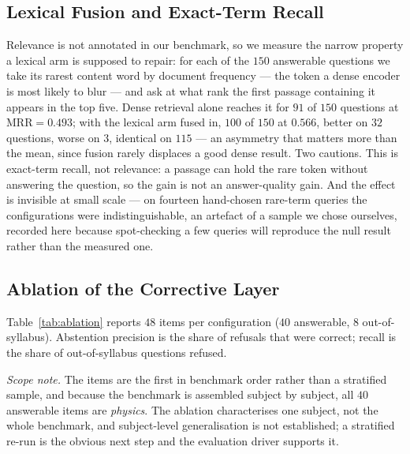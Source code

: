 \documentclass[conference]{IEEEtran}
\begin{document}
\subsection{Lexical Fusion and Exact-Term Recall}
\label{sec:hybrideval}
Relevance is not annotated in our benchmark, so we measure the narrow property a
lexical arm is supposed to repair: for each of the $150$ answerable questions we
take its rarest content word by document frequency --- the token a dense encoder
is most likely to blur --- and ask at what rank the first passage containing it
appears in the top five. Dense retrieval alone reaches it for $91$ of $150$
questions at $\mathrm{MRR} = 0.493$; with the lexical arm fused in, $100$ of
$150$ at $0.566$, better on $32$ questions, worse on $3$, identical on $115$ ---
an asymmetry that matters more than the mean, since fusion rarely displaces a
good dense result. Two cautions. This is exact-term recall, not relevance: a
passage can hold the rare token without answering the question, so the gain is
not an answer-quality gain. And the effect is invisible at small scale --- on
fourteen hand-chosen rare-term queries the configurations were
indistinguishable, an artefact of a sample we chose ourselves, recorded here
because spot-checking a few queries will reproduce the null result rather than
the measured one.

\subsection{Ablation of the Corrective Layer}
\label{sec:ablation}
Table~\ref{tab:ablation} reports $48$ items per configuration ($40$ answerable,
$8$ out-of-syllabus). Abstention precision is the share of refusals that were
correct; recall is the share of out-of-syllabus questions refused.

\textit{Scope note.} The items are the first in benchmark order rather than a
stratified sample, and because the benchmark is assembled subject by subject,
all $40$ answerable items are \emph{physics}. The ablation characterises one
subject, not the whole benchmark, and subject-level generalisation is not
established; a stratified re-run is the obvious next step and the evaluation
driver supports it.
\end{document}
